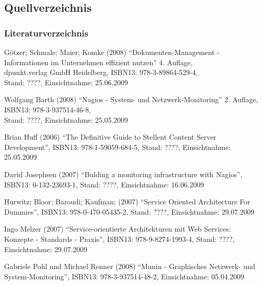 \documentclass[12pt, a4paper, headsepline]{article}
\begin{document}
\subsection{Quellverzeichnis}

\subsubsection{Literaturverzeichnis}

\begin{thebibliography}{xxxxxxxx}
	 Götzer; Schmale; Maier; Komke (2008) "`Dokumenten-Management - Informationen im Unternehmen effizient nutzen"' 4. Auflage,\\
	 dpunkt.verlag GmbH Heidelberg,  
	 ISBN13: 978-3-89864-529-4,\\
	 Stand: ????, Einsichtnahme: 25.06.2009

	 Wolfgang Barth (2008) "`Nagios - System- und Netzwerk-Monitoring"' 2. Auflage, \\
	 ISBN13: 978-3-937514-46-8, \\
	 Stand: ????, Einsichtnahme: 25.05.2009
	 
	 Brian Huff (2006) "`The Definitive Guide to Stellent Content Server Development"', \newline ISBN13: 978-1-59059-684-5, \newline Stand: ????, Einsichtnahme: 25.05.2009

	 David Josephsen (2007) "`Bulding a monitoring infrastructure with Nagios"', \newline ISBN13: 0-132-23693-1, \newline Stand: ????, Einsichtnahme: 16.06.2009

	 Hurwitz; Bloor; Baroudi; Kaufman; (2007) "`Service Oriented Architecture For Dummies"', \newline ISBN13: 978-0-470-05435-2, \newline Stand: ????, Einsichtnahme: 29.07.2009
	 
		 Ingo Melzer (2007) "`Service-orientierte Architekturen mit Web Services: Konzepte - Standards - Praxis"', \newline ISBN13: 978-9-8274-1993-4, \newline Stand: ????, Einsichtnahme: 29.07.2009	 
		 
		 	  Gabriele Pohl und Michael Renner (2008) 
	 "`Munin - Graphisches Netzwerk- und System-Monitoring"', \newline ISBN13: 978-3-937514-48-2, Einsichtnahme: 05.04.2009\\	
	 	
\end{thebibliography}
\newpage
\end{document}
